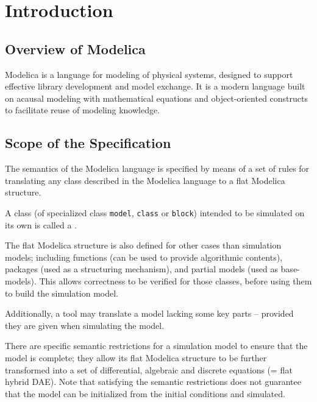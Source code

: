 \chapter{Introduction}\label{introduction1}

\section{Overview of Modelica}\label{overview-of-modelica}

Modelica is a language for modeling of physical systems, designed to
support effective library development and model exchange. It is a modern
language built on acausal modeling with mathematical equations and
object-oriented constructs to facilitate reuse of modeling knowledge.

\section{Scope of the Specification}\label{scope-of-the-specification}

The semantics of the Modelica language is specified by means of a set of
rules for translating any class described in the Modelica language to a
flat Modelica structure.

A class (of specialized class \lstinline!model!, \lstinline!class! or \lstinline!block!) intended to be simulated on its own is called a .

The flat Modelica structure is also defined for other cases than
simulation models; including functions (can be used to provide
algorithmic contents), packages (used as a structuring mechanism), and
partial models (used as base-models). This allows correctness to be
verified for those classes, before using them to build the simulation
model.

Additionally, a tool may translate a model lacking some key parts -- provided they are given when simulating the model.

There are specific semantic restrictions for a simulation model to
ensure that the model is complete; they allow its flat Modelica
structure to be further transformed into a set of differential,
algebraic and discrete equations (= flat hybrid DAE). Note that
satisfying the semantic restrictions does not guarantee that the model
can be initialized from the initial conditions and simulated.

